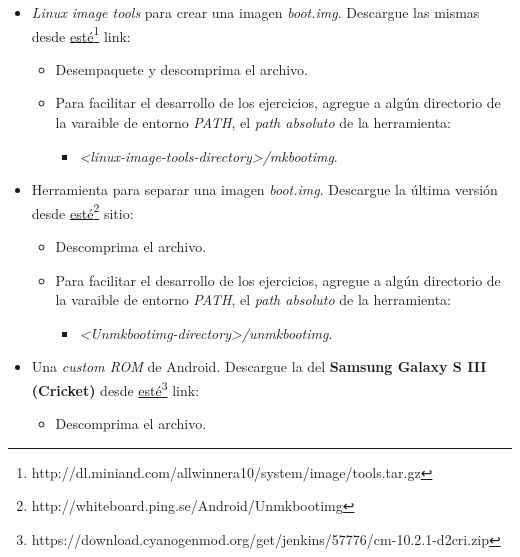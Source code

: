 \begin{itemize}
 \item \textit{Linux image tools} para crear una imagen \textit{boot.img}. Descargue las mismas desde \href{http://dl.miniand.com/allwinnera10/system/image/tools.tar.gz}{esté}\footnote{http://dl.miniand.com/allwinnera10/system/image/tools.tar.gz} link:
 \begin{itemize}
      \item Desempaquete y descomprima el archivo.

      \item Para facilitar el desarrollo de los ejercicios, agregue a algún directorio de la varaible de entorno \textit{PATH}, el \textit{path absoluto} de la herramienta:
      \begin{itemize}
	\item \textit{<linux-image-tools-directory>/mkbootimg}.
      \end{itemize}
 \end{itemize}
 
 \item Herramienta para separar una imagen \textit{boot.img}. Descargue la última versión desde \href{http://whiteboard.ping.se/Android/Unmkbootimg}{esté}\footnote{http://whiteboard.ping.se/Android/Unmkbootimg} sitio:
 \begin{itemize}
      \item Descomprima el archivo.

      \item Para facilitar el desarrollo de los ejercicios, agregue a algún directorio de la varaible de entorno \textit{PATH}, el \textit{path absoluto} de la herramienta:
      \begin{itemize}
	\item \textit{<Unmkbootimg-directory>/unmkbootimg}.
      \end{itemize}
 \end{itemize}
 
 \item Una \textit{custom ROM} de Android. Descargue la del \textbf{Samsung Galaxy S III (Cricket)} desde \href{https://download.cyanogenmod.org/get/jenkins/57776/cm-10.2.1-d2cri.zip}{esté}\footnote{https://download.cyanogenmod.org/get/jenkins/57776/cm-10.2.1-d2cri.zip} link:
 \begin{itemize}
      \item Descomprima el archivo.
 \end{itemize} 
\end{itemize}


